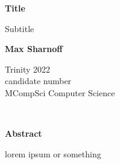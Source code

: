 \documentclass[12pt]{article}
\begin{document}

\begin{titlepage}
\begin{center}
    \Huge
    \textbf{Title}

    \vspace*{0.4cm}
    \LARGE
    Subtitle

    \vspace{1.5cm}
    \textbf{Max Sharnoff}

    Trinity 2022 \\
    candidate number \\
    MCompSci Computer Science

\end{center}
\end{titlepage}

\newpage\ \addtocounter{page}{-1} \thispagestyle{empty}

\newpage
{\Large \textbf{Abstract}}

\vspace{0.5cm}

lorem ipsum or something

\newpage
\tableofcontents

\newpage


\newpage

\end{document}
